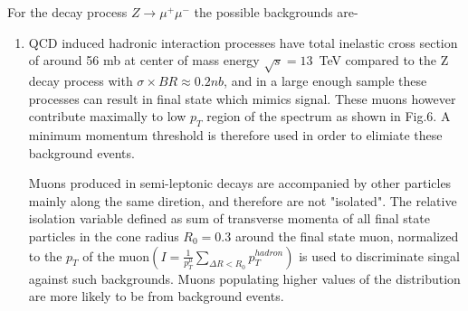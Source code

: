 \documentclass[12pt,a4paper]{article}		%
\begin{document}
					    For the decay process $Z \to \mu^+\mu^-$ the possible backgrounds are-
							\begin{enumerate}
								\item QCD induced hadronic interaction processes have total inelastic cross section of around 56 mb at center of mass energy $\sqrt{s} = 13$~TeV compared to the Z decay process with  $\sigma \times BR \approx 0.2nb$, 
								and in a large enough sample these processes can result in final state which mimics signal. These muons however contribute maximally to low $p_T$ region of the spectrum as shown in Fig.6. A minimum momentum threshold is therefore used in order to elimiate these background events.
								
	Muons produced in semi-leptonic decays are accompanied by other particles mainly along the same diretion, and therefore are not "isolated". The relative isolation variable defined as sum of transverse momenta of all final state particles in the cone radius $R_0 = 0.3$ around the final state muon, normalized to the $p_T$ of the muon$(I = \frac{1}{p_T^{\mu}}\sum_{\Delta R< R_0 }^{} p_T^{hadron})$
	is used to discriminate singal against such backgrounds. Muons populating higher values of the distribution are more likely to be from background events.  
								

\end{enumerate}
\end{document}
